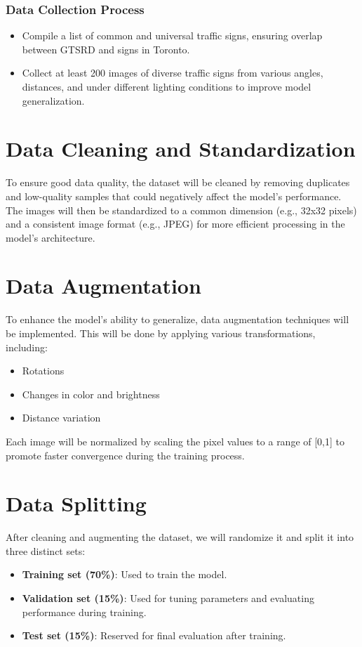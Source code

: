 \documentclass{article} %
\begin{document}
\subsubsection*{Data Collection Process}
\begin{itemize}
    \item Compile a list of common and universal traffic signs, ensuring overlap between GTSRD and signs in Toronto.
    \item Collect at least 200 images of diverse traffic signs from various angles, distances, and under different lighting conditions to improve model generalization.
\end{itemize}

\section*{Data Cleaning and Standardization}
To ensure good data quality, the dataset will be cleaned by removing duplicates and low-quality samples that could negatively affect the model’s performance. The images will then be standardized to a common dimension (e.g., 32x32 pixels) and a consistent image format (e.g., JPEG) for more efficient processing in the model’s architecture.

\section*{Data Augmentation}
To enhance the model's ability to generalize, data augmentation techniques will be implemented. This will be done by applying various transformations, including:
\begin{itemize}
    \item Rotations
    \item Changes in color and brightness
    \item Distance variation
\end{itemize}
Each image will be normalized by scaling the pixel values to a range of [0,1] to promote faster convergence during the training process.

\section*{Data Splitting}
After cleaning and augmenting the dataset, we will randomize it and split it into three distinct sets:
\begin{itemize}
    \item \textbf{Training set (70\%)}: Used to train the model.
    \item \textbf{Validation set (15\%)}: Used for tuning parameters and evaluating performance during training.
    \item \textbf{Test set (15\%)}: Reserved for final evaluation after training.
\end{itemize}
\end{document}
